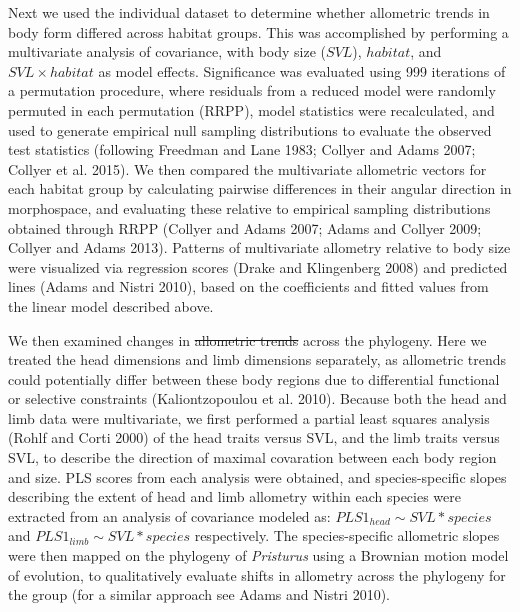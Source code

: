 \documentclass[
  11pt,
]{article}
\providecommand{\DIFaddtex}[1]{{\protect\color{blue}\uwave{#1}}} %
\providecommand{\DIFdeltex}[1]{{\protect\color{red}\sout{#1}}}                      %
\providecommand{\DIFaddbegin}{} %
\providecommand{\DIFaddend}{} %
\providecommand{\DIFdelbegin}{} %
\providecommand{\DIFdelend}{} %
\providecommand{\DIFadd}[1]{\texorpdfstring{\DIFaddtex{#1}}{#1}} %
\providecommand{\DIFdel}[1]{\texorpdfstring{\DIFdeltex{#1}}{}} %
\newcommand{\DIFscaledelfig}{0.5}
\newlength{\DIFdelgraphicswidth} %
\newlength{\DIFdelgraphicsheight} %
\newcommand{\DIFaddincludegraphics}[2][]{{\color{blue}\fbox{\DIFOincludegraphics[#1]{#2}}}} %
\newcommand{\DIFdelincludegraphics}[2][]{%
\sbox{\DIFdelgraphicsbox}{\DIFOincludegraphics[#1]{#2}}%
\settoboxwidth{\DIFdelgraphicswidth}{\DIFdelgraphicsbox} %
\settoboxtotalheight{\DIFdelgraphicsheight}{\DIFdelgraphicsbox} %
\scalebox{\DIFscaledelfig}{%
\parbox[b]{\DIFdelgraphicswidth}{\usebox{\DIFdelgraphicsbox}\\[-\baselineskip] \rule{\DIFdelgraphicswidth}{0em}}\llap{\resizebox{\DIFdelgraphicswidth}{\DIFdelgraphicsheight}{%
\setlength{\unitlength}{\DIFdelgraphicswidth}%
\begin{picture}(1,1)%
\thicklines\linethickness{2pt} %
{\color[rgb]{1,0,0}\put(0,0){\framebox(1,1){}}}%
{\color[rgb]{1,0,0}\put(0,0){\line( 1,1){1}}}%
{\color[rgb]{1,0,0}\put(0,1){\line(1,-1){1}}}%
\end{picture}%
}\hspace*{3pt}}} %
} %
\DeclareRobustCommand{\DIFaddbegin}{\DIFOaddbegin \let\includegraphics\DIFaddincludegraphics} %
\DeclareRobustCommand{\DIFaddend}{\DIFOaddend \let\includegraphics\DIFOincludegraphics} %
\DeclareRobustCommand{\DIFdelbegin}{\DIFOdelbegin \let\includegraphics\DIFdelincludegraphics} %
\DeclareRobustCommand{\DIFdelend}{\DIFOaddend \let\includegraphics\DIFOincludegraphics} %
\begin{document}
Next we used the individual dataset to determine whether allometric
trends in body form differed across habitat groups. This was
accomplished by performing a multivariate analysis of covariance, with
body size (\(SVL\)), \(habitat\), and \(SVL\times habitat\) as model
effects. Significance was evaluated using 999 iterations of a
permutation procedure, where residuals from a reduced model were
randomly permuted in each permutation (RRPP), model statistics were
recalculated, and used to generate empirical null sampling distributions
to evaluate the observed test statistics (following Freedman and Lane
1983; Collyer and Adams 2007; Collyer et al. 2015). We then compared the
multivariate allometric vectors for each habitat group by calculating
pairwise differences in their angular direction in morphospace, and
evaluating these relative to empirical sampling distributions obtained
through RRPP (Collyer and Adams 2007; Adams and Collyer 2009; Collyer
and Adams 2013). Patterns of multivariate allometry relative to body
size were visualized via regression scores (Drake and Klingenberg 2008)
and predicted lines (Adams and Nistri 2010), based on the coefficients
and fitted values from the linear model described above. \hfill\break

We then examined changes in \DIFdelbegin \DIFdel{allometric trends }\DIFdelend \DIFaddbegin \DIFadd{static allometry }\DIFaddend across the phylogeny. Here
we treated the head dimensions and limb dimensions separately, as \DIFaddbegin \DIFadd{static
}\DIFaddend allometric trends could potentially differ between these body regions
due to differential functional or selective constraints (Kaliontzopoulou
et al. 2010). Because both the head and limb data were multivariate, we
first performed a partial least squares \DIFaddbegin \DIFadd{(PLS) }\DIFaddend analysis (Rohlf and Corti
2000) of the head traits versus SVL, and the limb traits versus SVL, to
describe the direction of maximal covaration between each body region
and size. PLS scores from each analysis were obtained, and
species-specific slopes describing the extent of head and limb allometry
within each species were extracted from an analysis of covariance
modeled as: \(PLS1_{head} \sim SVL*species\) and
\(PLS1_{limb} \sim SVL*species\) respectively. The species-specific
allometric slopes were then mapped on the phylogeny of \emph{Pristurus}
using a Brownian motion model of evolution, to qualitatively evaluate
shifts in allometry across the phylogeny for the group (for a similar
approach see Adams and Nistri 2010). \hfill\break
\end{document}
